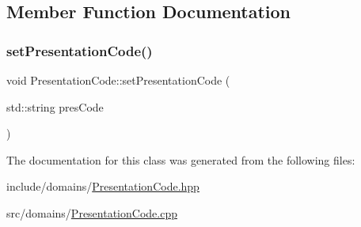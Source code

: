 \subsection{Member Function Documentation}
\mbox{\label{class_presentation_code_a867e2a8c5da78c3eaabb9ed8918f9521}} 
\subsubsection{\texorpdfstring{setPresentationCode()}{setPresentationCode()}}
{\footnotesize\ttfamily void Presentation\+Code\+::set\+Presentation\+Code (\begin{DoxyParamCaption}\item[{std\+::string}]{pres\+Code }\end{DoxyParamCaption})}



The documentation for this class was generated from the following files\+:\begin{DoxyCompactItemize}
\item 
include/domains/\mbox{\hyperlink{_presentation_code_8hpp}{Presentation\+Code.\+hpp}}\item 
src/domains/\mbox{\hyperlink{_presentation_code_8cpp}{Presentation\+Code.\+cpp}}\end{DoxyCompactItemize}
